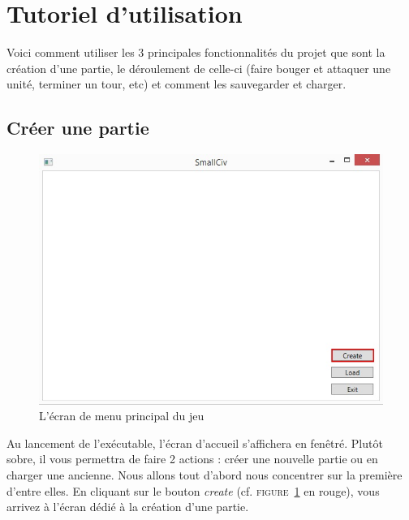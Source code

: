 \section{Tutoriel d'utilisation}
Voici comment utiliser les 3 principales fonctionnalités du projet que sont la création d'une partie, le déroulement de celle-ci (faire bouger et attaquer une unité, terminer un tour, etc) et comment les sauvegarder et charger. 

\subsection{Créer une partie}
\begin{figure}[h]
	\centering
	\includegraphics{img/acceuil_to_creation.jpg}
	\caption{L'écran de menu principal du jeu}
	\label{start}
\end{figure}
Au lancement de l'exécutable, l'écran d’accueil s'affichera en fenêtré. Plutôt sobre, il vous permettra de faire 2 actions : créer une nouvelle partie ou en charger une ancienne. Nous allons tout d'abord nous concentrer sur la première d'entre elles. En cliquant sur le bouton \emph{create} (cf. \textsc{figure~\ref{start}} en rouge), vous arrivez à l'écran dédié à la création d'une partie.\newline

